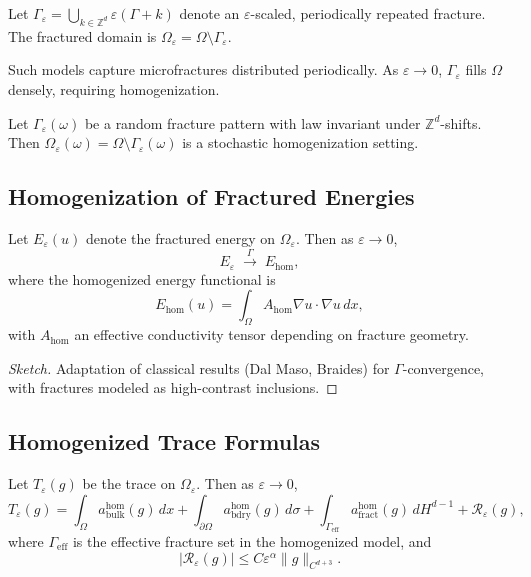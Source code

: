 \begin{definition}
Let $\Gamma_\varepsilon = \bigcup_{k \in \mathbb{Z}^d} \varepsilon (\Gamma + k)$ denote an $\varepsilon$-scaled, periodically repeated fracture. 
The fractured domain is $\Omega_\varepsilon = \Omega \setminus \Gamma_\varepsilon$. 
\end{definition}

\begin{remark}
Such models capture microfractures distributed periodically. 
As $\varepsilon \to 0$, $\Gamma_\varepsilon$ fills $\Omega$ densely, requiring homogenization. 
\end{remark}

\begin{definition}
Let $\Gamma_\varepsilon(\omega)$ be a random fracture pattern with law invariant under $\mathbb{Z}^d$-shifts. 
Then $\Omega_\varepsilon(\omega) = \Omega \setminus \Gamma_\varepsilon(\omega)$ is a stochastic homogenization setting. 
\end{definition}

\subsection{Homogenization of Fractured Energies}

\begin{theorem}
\label{thm:gamma-homogenization}
Let $E_\varepsilon(u)$ denote the fractured energy on $\Omega_\varepsilon$. 
Then as $\varepsilon \to 0$,
\[
E_\varepsilon \;\xrightarrow{\Gamma}\; E_{\mathrm{hom}},
\]
where the homogenized energy functional is
\[
E_{\mathrm{hom}}(u) = \int_\Omega A_{\mathrm{hom}} \nabla u \cdot \nabla u \, dx,
\]
with $A_{\mathrm{hom}}$ an effective conductivity tensor depending on fracture geometry. 
\end{theorem}

\begin{proof}[Sketch]
Adaptation of classical results (Dal Maso, Braides) for $\Gamma$-convergence, with fractures modeled as high-contrast inclusions. 
\end{proof}

\subsection{Homogenized Trace Formulas}

\begin{theorem}
\label{thm:homogenized-trace}
Let $T_\varepsilon(g)$ be the trace on $\Omega_\varepsilon$. 
Then as $\varepsilon \to 0$,
\[
T_\varepsilon(g) = \int_\Omega a_{\mathrm{bulk}}^{\mathrm{hom}}(g)\,dx + \int_{\partial \Omega} a_{\mathrm{bdry}}^{\mathrm{hom}}(g)\,d\sigma 
+ \int_{\Gamma_{\mathrm{eff}}} a_{\mathrm{fract}}^{\mathrm{hom}}(g)\,dH^{d-1} + \mathcal{R}_\varepsilon(g),
\]
where $\Gamma_{\mathrm{eff}}$ is the effective fracture set in the homogenized model, and
\[
|\mathcal{R}_\varepsilon(g)| \leq C \varepsilon^\alpha \|g\|_{C^{d+3}}.
\]
\end{theorem}

